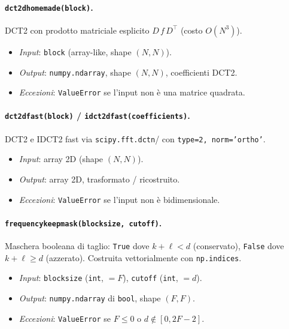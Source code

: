 \documentclass[11pt,a4paper]{article}
\makeatletter
\let\@origtexttt\texttt
\renewcommand{\texttt}[1]{{\def\_{\textunderscore\discretionary{}{}{}}\@origtexttt{#1}}}
\makeatother
\begin{document}
\paragraph{\texttt{dct\_2d\_homemade(block)}.}
DCT2 con prodotto matriciale esplicito $D\,f\,D^\top$ (costo $O(N^3)$).
\begin{itemize}
  \item \emph{Input}: \texttt{block} (array-like, shape $(N,N)$).
  \item \emph{Output}: \texttt{numpy.ndarray}, shape $(N,N)$, coefficienti DCT2.
  \item \emph{Eccezioni}: \texttt{ValueError} se l'input non è una matrice
        quadrata.
\end{itemize}

\paragraph{\texttt{dct\_2d\_fast(block)} / \texttt{idct\_2d\_fast(coefficients)}.}
DCT2 e IDCT2 fast via \texttt{scipy.\allowbreak fft.\allowbreak dctn}/\allowbreak\texttt{idctn} con
\texttt{type=2, norm='ortho'}.
\begin{itemize}
  \item \emph{Input}: array 2D (shape $(N,N)$).
  \item \emph{Output}: array 2D, trasformato / ricostruito.
  \item \emph{Eccezioni}: \texttt{ValueError} se l'input non è bidimensionale.
\end{itemize}

\paragraph{\texttt{frequency\_keep\_mask(block\_size, cutoff)}.}
Maschera booleana di taglio: \texttt{True} dove $k+\ell<d$ (conservato),
\texttt{False} dove $k+\ell\ge d$ (azzerato). Costruita vettorialmente con
\texttt{np.indices}.
\begin{itemize}
  \item \emph{Input}: \texttt{block\_size} (\texttt{int}, $=F$), \texttt{cutoff}
        (\texttt{int}, $=d$).
  \item \emph{Output}: \texttt{numpy.ndarray} di \texttt{bool}, shape $(F,F)$.
  \item \emph{Eccezioni}: \texttt{ValueError} se $F\le 0$ o $d\notin[0,2F-2]$.
\end{itemize}
\end{document}
